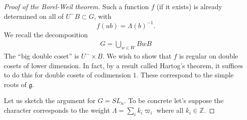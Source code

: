 \documentclass[12pt]{article}
\theoremstyle{plain}
\theoremstyle{definition}
\numberwithin{equation}{section}
\newcommand{\La}{\Lambda}
\newcommand{\Z}{\mathbb{Z}}
\newcommand{\g}{\mathfrak{g}}
\begin{document}
\begin{proof}[Proof of the Borel-Weil theorem]
Such a function $f$ (if it exists) is already determined on all of $U^-B \subset G$, with
\[
f(u b) = \Lambda(b)^{-1}.
\]
We recall the decomposition
\begin{align}\label{eq:Bru.dec}
G = \bigcup_{w \in W} B w B
\end{align}
The ``big double coset'' is $U^- \times B$. We wish to show that $f$ is regular on double cosets of lower dimension. In fact, by a result called Hartog's theorem, it suffices to do this for double cosets of codimension $1$. These correspond to the simple roots of $\g$.

Let us sketch the argument for $G = SL_n$. To be concrete let's suppose the character corresponds to the weight $\La = \sum_{i} k_i \varpi_i$ where all $k_i \in \Z$.


\end{proof}
\end{document}
